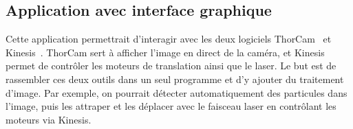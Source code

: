 \subsection{Application avec interface graphique}

Cette application permettrait d'interagir avec les deux logiciels ThorCam~\cite{thorcamSoftware} et Kinesis~\cite{kinesisSoftware}. ThorCam sert à afficher l'image en direct de la caméra, et Kinesis permet de contrôler les moteurs de translation ainsi que le laser. Le but est de rassembler ces deux outils dans un seul programme et d'y ajouter du traitement d'image. Par exemple, on pourrait détecter automatiquement des particules dans l'image, puis les attraper et les déplacer avec le faisceau laser en contrôlant les moteurs via Kinesis.